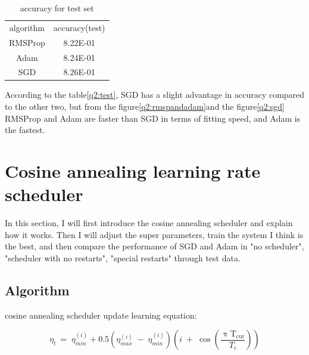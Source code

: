 \documentclass{article}
\begin{document}
\begin{table}[H]
  \centering
  \caption{accuracy for test set}\label{q2:test}
    \begin{tabular}{|c|c|}
    \toprule
    \multirow{2}[2]{*}{algorithm} & \multirow{2}[2]{*}{accuracy(test)} \\
          &  \\
    \midrule
    \multicolumn{1}{|c|}{\multirow{2}[2]{*}{RMSProp}} & \multirow{2}[2]{*}{8.22E-01} \\
          &  \\
    \midrule
    \multicolumn{1}{|c|}{\multirow{2}[2]{*}{Adam}} & \multirow{2}[2]{*}{8.24E-01} \\
          &  \\
    \midrule
    \multicolumn{1}{|c|}{\multirow{2}[2]{*}{SGD}} & \multirow{2}[2]{*}{8.26E-01} \\
          &  \\
    \bottomrule
    \end{tabular}%
  \label{tab:addlabel}%
\end{table}%

According to the table\ref{q2:test}, SGD has a slight advantage in accuracy compared to the other two, but from the figure\ref{q2:rmspandadam}and the figure\ref{q2:sgd} RMSProp and Adam are faster than SGD in terms of fitting speed, and Adam is the fastest.


\section{Cosine annealing learning rate scheduler}

In this section, I will first introduce the cosine annealing scheduler and explain how it works. Then I will adjust the super parameters, train the system I think is the best, and then compare the performance of SGD and Adam in "no scheduler", "scheduler with no restarts", "special restarts" through test data.

\subsection{Algorithm}

cosine annealing scheduler update learning equation:

\begin{equation}\label{q3:cosine}
\eta_{t\;}=\;\eta_{min}^{(i)}+0.5(\eta_{max}^{(i)}\;-\;\eta_{min}^{(i)})(i\;+\;\cos(\frac{{\mathrm{\uppi T}}_\mathrm{cur}}{T_i}))
\end{equation}
\end{document}
